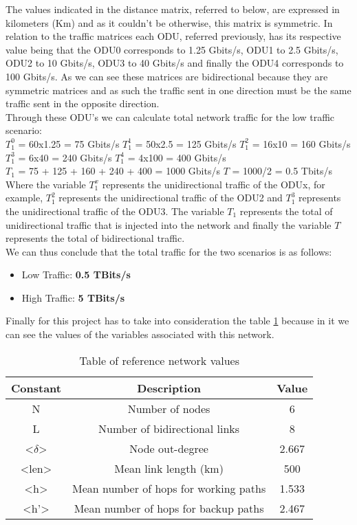 The values indicated in the distance matrix, referred to below, are expressed in kilometers (Km) and as it couldn't be otherwise, this matrix is symmetric.
In relation to the traffic matrices each ODU, referred previously, has its respective value being that the ODU0 corresponds to 1.25 Gbits/s, ODU1 to 2.5 Gbits/s, ODU2 to 10 Gbits/s, ODU3 to 40 Gbits/s and finally the ODU4 corresponds to 100 Gbits/s.
As we can see these matrices are bidirectional because they are symmetric matrices and as such the traffic sent in one direction must be the same traffic sent in the opposite direction. \\

Through these ODU's we can calculate total network traffic for the low traffic scenario:\\

$T_1^0$ = 60x1.25 = 75 Gbits/s \qquad
$T_1^1$ = 50x2.5 = 125 Gbits/s \qquad
$T_1^2$ = 16x10 = 160 Gbits/s \\

$T_1^3$ = 6x40 = 240 Gbits/s \quad
$T_1^4$ = 4x100 = 400 Gbits/s \\

$T_{1}$ = 75 + 125 + 160 + 240 + 400 = 1000 Gbits/s \qquad
$T$ = 1000/2 = 0.5 Tbits/s\\

Where the variable $T_1^x$ represents the unidirectional traffic of the ODUx, for example, $T_1^2$ represents the unidirectional traffic of the ODU2 and $T_1^3$ represents the unidirectional traffic of the ODU3. The variable $T_{1}$ represents the total of unidirectional traffic that is injected into the network and finally the variable $T$ represents the total of bidirectional traffic.\\

We can thus conclude that the total traffic for the two scenarios is as follows:
\begin{itemize}
  \item Low Traffic: \textbf{0.5 TBits/s}
  \item High Traffic: \textbf{5 TBits/s}
\end{itemize}

Finally for this project has to take into consideration the table \ref{table:5} because in it we can see the values of the variables associated with this network.
\begin{table}[h!]
\centering
\begin{tabular}{|| c | c | c||}
 \hline
 Constant & Description & Value \\
 \hline\hline
 N & Number of nodes & 6 \\
 L & Number of bidirectional links & 8 \\
 <$\delta$> & Node out-degree & 2.667 \\
 <len> & Mean link length (km) & 500 \\
 <h> & Mean number of hops for working paths & 1.533 \\
 <h'> & Mean number of hops for backup paths & 2.467 \\
 \hline
\end{tabular}
\caption{Table of reference network values}
\label{table:5}
\end{table}

